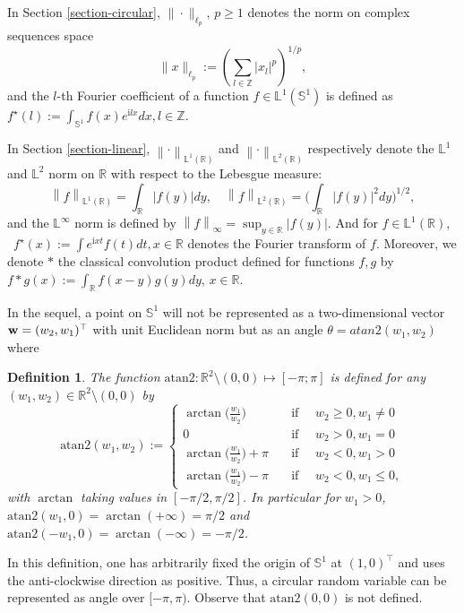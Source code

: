 \documentclass[11pt,a4paper,openany]{article}
\newtheorem{definition}[thm]{Definition}
\newcommand{\Atan}{\mbox{atan2}}
\def\R{\mathbb{R}}
\def\L{\mathbb{L}}
\def\S{\mathbb{S}}
\def \compi{\mathrm{i}}
\begin{document}
\medskip

In Section \ref{section-circular}, $\| \cdot \|_{\ell_p}, \, p \geq 1$ denotes the norm on complex sequences space
$$
\| x \|_{\ell_p} := \left (\sum_{l \in \mathbb{Z}} |x_l|^p \right )^{1/p},
$$
and the $l$-th Fourier coefficient of a function $f \in \mathbb{L}^1(\S^1)$ is defined as  $f^{\star}(l) := \int_{\S^1} f(x) e^{\mathrm{i}lx} dx, l \in \mathbb{Z}$.
\medskip


In Section \ref{section-linear}, $\left\| \cdot \right\|_{\L^{1}(\R)}$ and $\left\| \cdot \right\|_{\L^{2}(\R)}$ respectively denote the $\L^{1}$ and $\L^{2}$ norm on $\R$ with respect to the Lebesgue measure:
\begin{equation*}
\left\| f \right\|_{\L^{1}(\R)}  =  \int_{\R} |f(y)| dy , \quad \left\| f \right\|_{\L^{2}(\R)}  = \Big( \int_{\R} |f(y)|^{2} dy  \Big)^{1/2},
\end{equation*}
and the $\L^{\infty}$ norm is defined by $\left\|f\right\|_{\infty} = \sup_{y \in \R} |f(y)|$. And for $f \in \L^{1}(\R)$,  \ $f^{\star}(x):= \int e^{\compi xt} f(t) dt, x \in \R$ denotes the Fourier transform of $f$.  Moreover, we denote $*$ the classical convolution product defined for functions $f, g$ by $f * g(x) := \int_{\R} f(x-y)g(y) dy $, $x \in \R$. 
\medskip
 
 In the sequel, a point on $\mathbb{S}^1$ will not be represented as a two-dimensional vector $\bold{w}=(w_2,w_1)^\top$ with unit Euclidean norm but as an angle $\theta=atan2(w_1,w_2) $ where
\begin{definition}\label{def:full.formula.atan2} The function $\Atan: \R^2\setminus (0,0)\mapsto [-\pi;\pi]$ is defined for any $(w_1,w_2)\in\R^2\setminus (0,0)$ by \emph{
		$$
		\Atan (w_1,w_2):= \left \{
		\begin{array}{ll}
		\arctan\big( \frac{w_1}{w_2} \big) & \quad \mbox{if } \quad w_2 \geq 0 , w_{1} \neq 0 \\
		{0} & \quad {\mbox{if } \quad w_2 > 0 , w_{1} = 0} \\
		\arctan\big( \frac{w_1}{w_2} \big) + \pi & \quad \mbox{if } \quad w_2 < 0, w_1 >0 \\
		\arctan\big( \frac{w_1}{w_2} \big) - \pi & \quad \mbox{if } \quad w_2 < 0, w_1 \leq 0,
		\end{array}
		\right.
		$$
		with $\arctan$ taking values in $[- \pi/ 2, \pi/ 2]$. In particular for $w_1>0$, $\Atan (w_1,0)=\arctan(+\infty)=\pi/2$ and $\Atan (-w_1,0)=\arctan(-\infty)=-\pi/2$.
}\end{definition} 
In this definition, one has arbitrarily fixed the origin of $\mathbb{S}^1$ at $(1,0)^\top$ and uses the anti-clockwise direction as positive. Thus, a circular random variable can be represented as angle over $[-\pi, \pi)$. Observe that $\Atan (0,0)$ is not defined. 
\end{document}
